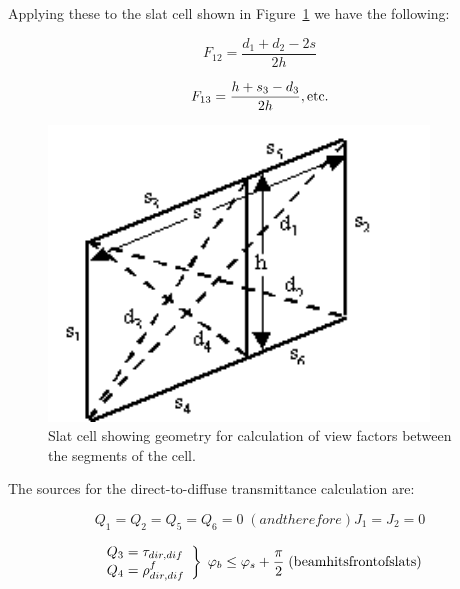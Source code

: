 Applying these to the slat cell shown in Figure~\ref{fig:slat-cell-showing-geometry-for-calculation-of} we have the following:

\begin{equation}
{F_{12}} = \frac{{{d_1} + {d_2} - 2s}}{{2h}}
\end{equation}

\begin{equation}
{F_{13}} = \frac{{h + {s_3} - {d_3}}}{{2h}}{\rm{ ,  etc}}{\rm{.}}
\end{equation}

\begin{figure}[hbtp] %
\centering
\includegraphics[width=0.9\textwidth, height=0.9\textheight, keepaspectratio=true]{media/image1063.png}
\caption{Slat cell showing geometry for calculation of view factors between the segments of the cell. \protect \label{fig:slat-cell-showing-geometry-for-calculation-of}}
\end{figure}

The sources for the direct-to-diffuse transmittance calculation are:

\begin{equation}
{Q_1} = {Q_2} = {Q_5} = {Q_6} = 0 \;  (and therefore) {J_1} = {J_2} = 0
\end{equation}

\begin{equation}
\left. 
    \begin{array}{l}
      Q_3 = \tau_{dir,dif} \\
      Q_4 = \rho_{dir,dif}^f 
    \end{array} 
  \right\} 
  \;
  \varphi_b \le \varphi_s + \frac{\pi }{2} 
  \;
  \rm{ (beam hits front of slats)}
\end{equation}

